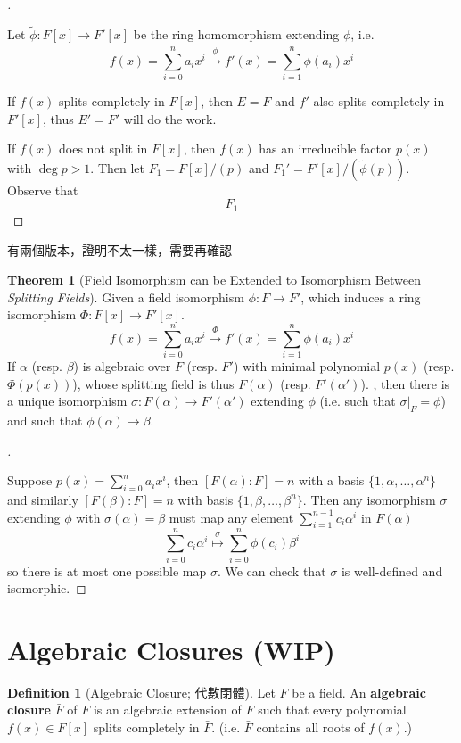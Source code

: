\documentclass{article}
\theoremstyle{definition}
\newtheorem{thm}{Theorem}
\newtheorem{dfn}{Definition}
\newenvironment{proofs}[1][\proofname]{%
  \begin{proof}[#1]$ $\par\nobreak\ignorespaces
}{%
  \end{proof}
}
\begin{document}
\begin{proofs}
	Let $\tilde{\phi}:F[x]\to F'[x]$ be the ring homomorphism extending $\phi$, i.e.
	\[f(x)=\sum_{i=0}^n a_i x^i \overset{\tilde{\phi}}{\mapsto} f'(x)=\sum_{i=1}^n \phi(a_i) x^i\]
	
	If $f(x)$ splits completely in $F[x]$, then $E=F$ and $f'$ also splits completely in $F'[x]$, thus $E'=F'$ will do the work.

	If $f(x)$ does not split in $F[x]$, then $f(x)$ has an irreducible factor $p(x)$ with $\deg p>1$.
	Then let $F_1=F[x]/(p)$ and $F_1'=F'[x]/(\tilde{\phi}(p))$. Observe that
	\[F_1\]

\end{proofs}

有兩個版本，證明不太一樣，需要再確認
\begin{thm}[Field Isomorphism can be Extended to Isomorphism Between \textit{Splitting Fields}]
	Given a field isomorphism $\phi:F\to F'$, which induces a ring isomorphism $\Phi: F[x]\to F'[x]$. 
	\[f(x)=\sum_{i=0}^n a_i x^i \overset{{\Phi}}{\mapsto} f'(x)=\sum_{i=1}^n \phi(a_i) x^i\]
	If $\alpha$ (resp. $\beta$) is algebraic over $F$ (resp. $F'$) with minimal polynomial $p(x)$ (resp. $\Phi(p(x))$), whose splitting field is thus $F(\alpha)$ (resp. $F'(\alpha')$).
	, then there is a unique isomorphism $\sigma: F(\alpha)\to F'(\alpha')$ extending $\phi$ (i.e. such that $\sigma|_F=\phi$) and such that $\phi(\alpha)\to\beta$.
\end{thm}

\begin{proofs}
	Suppose $p(x)=\sum_{i=0}^n a_i x^i$, then $[F(\alpha):F]=n$ with a basis $\{1,\alpha, \dots,\alpha^n\}$
	and similarly $[F(\beta):F]=n$ with basis $\{1,\beta,\dots,\beta^n\}$. 	
	Then any isomorphism $\sigma$ extending $\phi$ with $\sigma(\alpha)=\beta$ must map any element $\sum_{i=1}^{n-1} c_i \alpha^i$ in $F(\alpha)$
	\[\sum_{i=0}^n c_i \alpha^i \overset\sigma\mapsto \sum_{i=0}^n \phi(c_i) \beta^i \]
	so there is at most one possible map $\sigma$. We can check that $\sigma$ is well-defined and isomorphic.
\end{proofs}

\section{Algebraic Closures (WIP)}

\begin{dfn}[Algebraic Closure; 代數閉體]
	Let $F$ be a field. 
	An \textbf{algebraic closure} $\bar{F}$ of $F$ is an algebraic extension of $F$ such that every polynomial $f(x) \in F[x]$ splits completely in $\bar{F}$.
	(i.e. $\bar{F}$ contains all roots of $f(x)$.)
\end{dfn}
\end{document}
